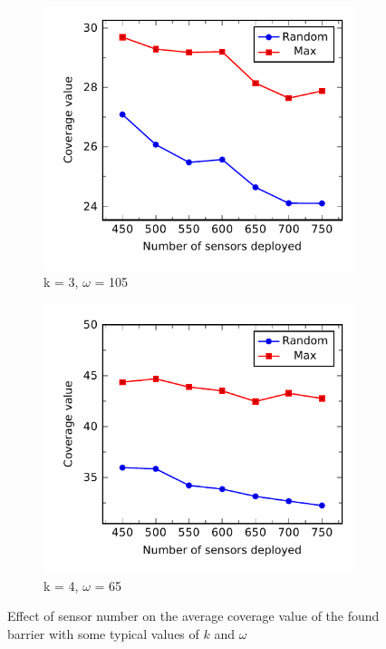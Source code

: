 \begin{figure}[!h]
	\begin{subfigure}{.5\textwidth}
		\centering
		\includegraphics[scale=.8]{Hinhanh/SensorNumberEffect/coverage/k3omega105.pdf}
		\caption{k = 3, $\omega$ = 105}
	\end{subfigure}
	\begin{subfigure}{.5\textwidth}
		\centering
		\includegraphics[scale=.8]{Hinhanh/SensorNumberEffect/coverage/k4omega65.pdf}
		\caption{k = 4, $\omega$ = 65}
	\end{subfigure}
\caption{Effect of sensor number on the average coverage value of the found barrier with some typical values of $k$ and $\omega$}
\label{fig:nv}
\end{figure}
